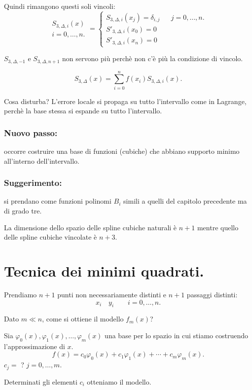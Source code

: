 Quindi rimangono questi soli vincoli:
\[
\begin{array}{c}S_{3,\Delta,i}(x) \\i = 0, \ldots, n. \end{array}= \left\{
\begin{array}{llr}
S_{3,\Delta,i}(x_j) = \delta_{i,j} & & j = 0, \ldots, n. \\
S'_{3,\Delta,i}(x_0) = 0 \\
S'_{3,\Delta,i}(x_n) = 0
\end{array}
\right.
\]

$S_{3,\Delta,-1}$ e $S_{3,\Delta,n+1}$ non servono più perchè non c'è più la
condizione di vincolo.

\[
S_{3,\Delta}(x) = \sum_{i=0}^nf(x_i)S_{3,\Delta,i}(x).
\]

Cosa disturba? L'errore locale si propaga su tutto  l'intervallo come in
Lagrange, perchè la base stessa si espande su tutto l'intervallo.

\subsubsection{Nuovo passo:}
occorre costruire una base di funzioni (cubiche) che abbiano supporto minimo
all'interno dell'intervallo.
\subsubsection{Suggerimento:}
si prendano come funzioni polinomi $B_i$ simili a quelli del capitolo
precedente ma di grado tre.

\begin{osse}
La dimensione dello spazio delle spline cubiche naturali è $n+1$ mentre quello
delle spline cubiche vincolate è $n+3$.
\end{osse}

\section{Tecnica dei minimi quadrati.}
\label{min-quad}
Prendiamo $n+1$ punti non necessariamente distinti e $n+1$ passaggi distinti:
\[
x_i \quad y_i \qquad i = 0, \ldots, n.
\]

Dato $m \ll n$, come si  ottiene il modello $f_m(x)$?

\begin{flushleft}
Sia $\varphi_0(x), \varphi_1(x), \ldots, \varphi_m(x)$ una base per lo spazio
in cui stiamo costruendo l'approssimazione di $x$.
\[
f(x) = c_0\varphi_0(x) + c_1\varphi_1(x) + \cdots + c_m\varphi_m(x).
\]
$c_j=$ ? $j = 0, \ldots, m$.
\end{flushleft}
Determinati gli elementi $c_i$ otteniamo il modello.

